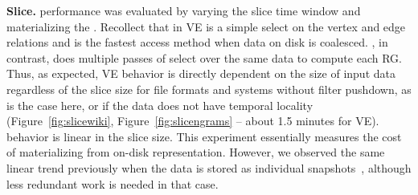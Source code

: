{\bf Slice.}   performance was evaluated by varying the
slice time window and materializing the \tg.  Recollect that in VE
 is a simple select on the vertex and edge relations and
is the fastest access method when data on disk is coalesced.  \sg, in
contrast, does multiple passes of select over the same data to compute
each RG.  Thus, as expected, VE behavior is directly dependent on the
size of input data regardless of the slice size for file formats and
systems without filter pushdown, as is the case here, or if the data
does not have temporal locality (Figure~\ref{fig:slicewiki},
Figure~\ref{fig:slicengrams} -- about 1.5 minutes for VE).  \sg
behavior is linear in the slice size.  This experiment essentially
measures the cost of materializing \sg from \ve on-disk
representation.  However, we observed the same linear trend previously
when the data is stored as individual
snapshots~\cite{PortalarXiv2016}, although less redundant work is
needed in that case.


